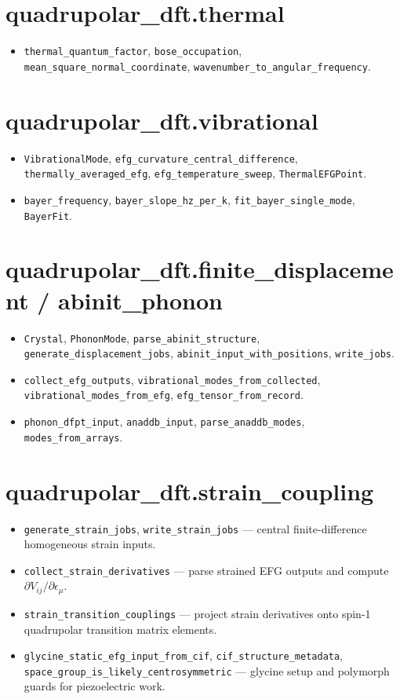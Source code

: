 \documentclass[11pt,oneside]{report}
\newcommand{\code}[1]{{\small\nolinkurl{#1}}}
\begin{document}
\section{quadrupolar\_dft.thermal}
\begin{itemize}
  \item \code{thermal\_quantum\_factor}, \code{bose\_occupation},
    \code{mean\_square\_normal\_coordinate}, \code{wavenumber\_to\_angular\_frequency}.
\end{itemize}

\section{quadrupolar\_dft.vibrational}
\begin{itemize}
  \item \code{VibrationalMode}, \code{efg\_curvature\_central\_difference},
    \code{thermally\_averaged\_efg}, \code{efg\_temperature\_sweep},
    \code{ThermalEFGPoint}.
  \item \code{bayer\_frequency}, \code{bayer\_slope\_hz\_per\_k},
    \code{fit\_bayer\_single\_mode}, \code{BayerFit}.
\end{itemize}

\section{quadrupolar\_dft.finite\_displacement / abinit\_phonon}
\begin{itemize}
  \item \code{Crystal}, \code{PhononMode}, \code{parse\_abinit\_structure},
    \code{generate\_displacement\_jobs}, \code{abinit\_input\_with\_positions},
    \code{write\_jobs}.
  \item \code{collect\_efg\_outputs}, \code{vibrational\_modes\_from\_collected},
    \code{vibrational\_modes\_from\_efg}, \code{efg\_tensor\_from\_record}.
  \item \code{phonon\_dfpt\_input}, \code{anaddb\_input},
    \code{parse\_anaddb\_modes}, \code{modes\_from\_arrays}.
\end{itemize}

\section{quadrupolar\_dft.strain\_coupling}
\begin{itemize}
  \item \code{generate\_strain\_jobs}, \code{write\_strain\_jobs} --- central
    finite-difference homogeneous strain inputs.
  \item \code{collect\_strain\_derivatives} --- parse strained EFG outputs and
    compute $\partial V_{ij}/\partial\epsilon_\mu$.
  \item \code{strain\_transition\_couplings} --- project strain derivatives onto
    spin-1 quadrupolar transition matrix elements.
  \item \code{glycine\_static\_efg\_input\_from\_cif},
    \code{cif\_structure\_metadata},
    \code{space\_group\_is\_likely\_centrosymmetric} --- glycine setup and
    polymorph guards for piezoelectric work.
\end{itemize}
\end{document}
